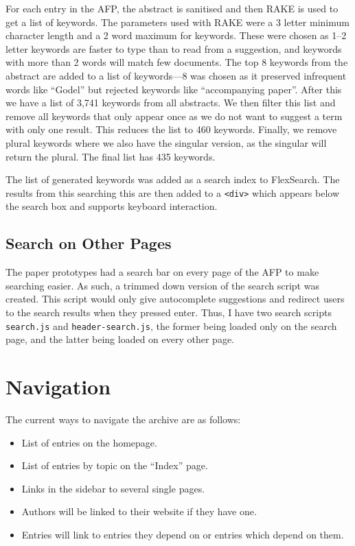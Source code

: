 \documentclass[bsc,frontabs,oneside,singlespacing,parskip,deptreport,logo]{infthesis}
\begin{document}
\cbstart
For each entry in the AFP, the abstract is sanitised and then RAKE is used to get a list of keywords. The parameters used with RAKE were a 3 letter minimum character length and a 2 word maximum for keywords. These were chosen as 1--2 letter keywords are faster to type than to read from a suggestion, and keywords with more than 2 words will match few documents. The top 8 keywords from the abstract are added to a list of keywords---8 was chosen as it preserved infrequent words like ``Godel'' but rejected keywords like ``accompanying paper''. After this we have a list of 3,741 keywords from all abstracts. We then filter this list and remove all keywords that only appear once as we do not want to suggest a term with only one result. This reduces the list to 460 keywords. Finally, we remove plural keywords where we also have the singular version, as the singular will return the plural. The final list has 435 keywords.
\cbend

The list of generated keywords was added as a search index to FlexSearch. The results from this searching this are then added to a \verb|<div>| which appears below the search box and supports keyboard interaction.

\subsection{Search on Other Pages}

The paper prototypes had a search bar on every page of the AFP to make searching easier. As such, a trimmed down version of the search script was created. This script would only give autocomplete suggestions and redirect users to the search results when they pressed enter. Thus, I have two search scripts \verb|search.js| and \verb|header-search.js|, the former being loaded only on the search page, and the latter being loaded on every other page.

\section{Navigation}

The current ways to navigate the archive are as follows:

\begin{itemize}
    \item List of entries on the homepage.
    \item List of entries by topic on the ``Index'' page.
    \item Links in the sidebar to several single pages.
    \item Authors will be linked to their website if they have one.
    \item Entries will link to entries they depend on or entries which depend on them.
\end{itemize}
\end{document}
